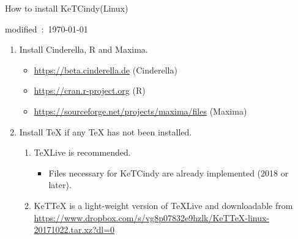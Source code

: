 \documentclass{article}
\begin{document}
\begin{center}
How to install KeTCindy(Linux)
\end{center}

\hfill modified\ :\ \today

\begin{enumerate}[\bf\large 1.]

\item Install Cinderella, R and Maxima.
 \begin{itemize}
 \item \url{https://beta.cinderella.de}  (Cinderella)
 \item \url{https://cran.r-project.org}   (R)
 \item \url{https://sourceforge.net/projects/maxima/files}  (Maxima)
 \end{itemize}

\item Install TeX if any TeX has not been installed.
  \begin{enumerate}[(1)]
  \item TeXLive is recommended.
    \begin{itemize}
    \item Files necessary for KeTCindy are already implemented (2018 or later).
    \end{itemize}
  \item KeTTeX is a light-weight version of TeXLive and downloadable from\\
  \hspace*{6mm}\url{https://www.dropbox.com/s/vg8p07832e9hzlk/KeTTeX-linux-20171022.tar.xz?dl=0}
 \end{enumerate}



\end{enumerate}
\end{document}

